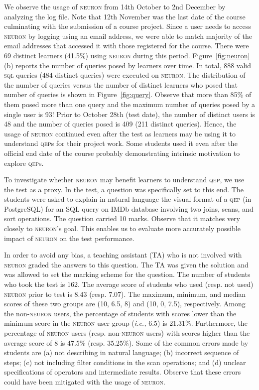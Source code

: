 \documentclass[11pt]{article}
\newcommand{\ie}{\emph{i.e.,}\xspace}
\begin{document}
We observe the usage of \textsc{neuron} from 14th October to 2nd December by analyzing the log file. Note that 12th November was the last date of the course culminating with the submission of a course project. Since a user needs to access \textsc{neuron} by logging using an email address, we were able to match majority of the email addresses that accessed it with those registered for the course. There were 69 distinct learners (41.5\%) using \textsc{neuron} during this period. Figure~\ref{fig:neuron}(b) reports the number of queries posed by learners over time. In total, 888 valid \textsc{sql} queries (484 distinct queries) were executed on \textsc{neuron}. The distribution of the number of queries versus the number of distinct learners who posed that number of queries is shown in Figure~\ref{fig:query}. Observe that more than 85\% of them posed more than one query and the maximum number of queries posed by a single user is 93! Prior to October 28th (test date), the number of distinct users is 48 and the number of queries posed is 409 (211 distinct queries). Hence, the usage of \textsc{neuron} continued even after the test as learners may be using it to understand \textsc{qep}s for their project work. Some students used it even after the official end date of the course probably demonstrating intrinsic motivation to explore \textsc{qep}s. 

To investigate whether \textsc{neuron} may benefit learners to understand \textsc{qep}, we use the test as a proxy. In the test, a question was specifically set to this end. The students were asked to explain in natural language the visual format of a \textsc{qep}  (in PostgreSQL) for an \textsc{SQL} query on IMDb database involving two joins, scans, and sort operations. The question carried 10 marks. Observe that it matches very closely to \textsc{neuron}'s goal. This enables us to evaluate more accurately possible impact of \textsc{neuron} on the test performance.  

 In order to avoid any bias, a teaching assistant (TA) who is not involved with \textsc{neuron} graded the answers to this question.  The TA was given the solution and was allowed to set the marking scheme for the question. The number of students who took the test is 162. The average score of students who used (resp. not used) \textsc{neuron} prior to test is 8.43 (resp. 7.07). The maximum, minimum, and median scores of these two groups are (10, 6.5, 8) and (10, 0, 7.5), respectively. Among the non-\textsc{neuron} users, the percentage of students with scores lower than the minimum score in the \textsc{neuron} user group (\ie 6.5)  is 21.31\%.  Furthermore, the percentage of \textsc{neuron} users (resp. non-\textsc{neuron} users) with scores higher than the average score of 8 is 47.5\% (resp. 35.25\%). Some of the common errors made by students are (a) not describing in natural language; (b) incorrect sequence of steps; (c) not including filter conditions in the scan operations; and (d) unclear specifications of operators and intermediate results. Observe that these errors could have been mitigated with the usage of \textsc{neuron}.
\end{document}
